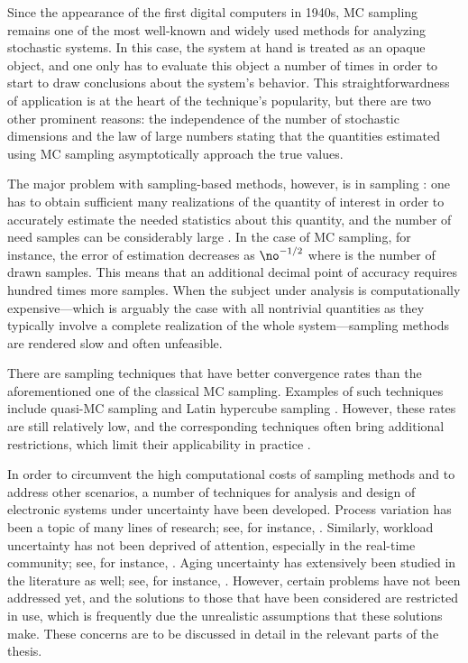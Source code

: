 Since the appearance of the first digital computers in 1940s, \ac{MC} sampling
remains one of the most well-known and widely used methods for analyzing
stochastic systems. In this case, the system at hand is treated as an opaque
object, and one only has to evaluate this object a number of times in order to
start to draw conclusions about the system's behavior. This straightforwardness
of application is at the heart of the technique's popularity, but there are two
other prominent reasons: the independence of the number of stochastic dimensions
and the law of large numbers \cite{durrett2010} stating that the quantities
estimated using \ac{MC} sampling asymptotically approach the true values.

The major problem with sampling-based methods, however, is in sampling \perse:
one has to obtain sufficient many realizations of the quantity of interest in
order to accurately estimate the needed statistics about this quantity, and the
number of need samples can be considerably large \cite{diaz-emparanza2002}. In
the case of \ac{MC} sampling, for instance, the error of estimation decreases as
$\no^{-1/2}$ where \no is the number of drawn samples. This means that an
additional decimal point of accuracy requires hundred times more samples. When
the subject under analysis is computationally expensive---which is arguably the
case with all nontrivial quantities as they typically involve a complete
realization of the whole system---sampling methods are rendered slow and often
unfeasible.

There are sampling techniques that have better convergence rates than the
aforementioned one of the classical \ac{MC} sampling. Examples of such
techniques include quasi-\ac{MC} sampling and Latin hypercube sampling
\cite{asmussen2007}. However, these rates are still relatively low, and the
corresponding techniques often bring additional restrictions, which limit their
applicability in practice \cite{xiu2010}.

In order to circumvent the high computational costs of sampling methods and to
address other scenarios, a number of techniques for analysis and design of
electronic systems under uncertainty have been developed. Process variation has
been a topic of many lines of research; see, for instance, \cite{bhardwaj2006,
bhardwaj2008, chandra2010, juan2012, lee2013}. Similarly, workload uncertainty
has not been deprived of attention, especially in the real-time community; see,
for instance, \cite{diaz2002, santinelli2011, quinton2012, tanasa2015}. Aging
uncertainty has extensively been studied in the literature as well; see, for
instance, \cite{coskun2006, huang2009b, das2014c}. However, certain problems
have not been addressed yet, and the solutions to those that have been
considered are restricted in use, which is frequently due the unrealistic
assumptions that these solutions make. These concerns are to be discussed in
detail in the relevant parts of the thesis.

